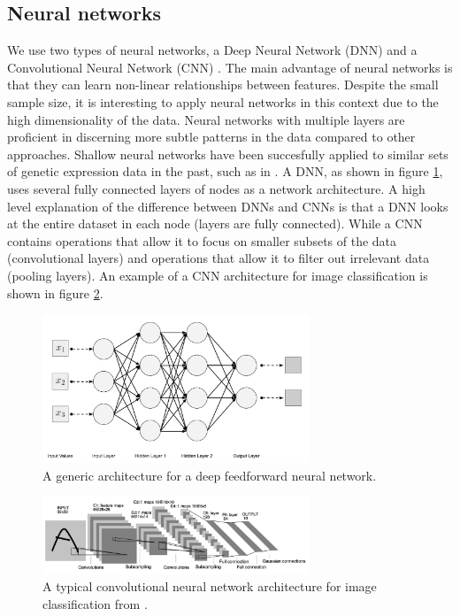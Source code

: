 \documentclass[a4paper,10pt]{article}
\begin{document}
\subsection{Neural networks}
%
We use two types of neural networks, a Deep Neural Network (DNN) \cite{lecun2015deep} and a Convolutional Neural Network (CNN) \cite{Lecun98}. The main advantage of neural networks is that they can learn non-linear relationships between features. Despite the small sample size, it is interesting to apply neural networks in this context due to the high dimensionality of the data. Neural networks with multiple layers are proficient in discerning more subtle patterns in the data compared to other approaches. Shallow neural networks have been succesfully applied to similar sets of genetic expression data in the past, such as in \cite{khan2001classification}.
A DNN, as shown in figure \ref{fig:dnn_architecture}, uses several fully connected layers of nodes as a network architecture. A high level explanation of the difference between DNNs and CNNs is that a DNN looks at the entire dataset in each node (layers are fully connected).
While a CNN contains operations that allow it to focus on smaller subsets of the data (convolutional layers) 
and operations that allow it to filter out irrelevant data (pooling layers). An example of a CNN architecture for image classification is shown in figure \ref{fig:cnn_architecture}.

\begin{figure}[htp]
  \centering{}
  \includegraphics[width=8cm]{images/DNN}
  \caption{A generic architecture for a deep feedforward neural network.}
  \label{fig:dnn_architecture}
\end{figure}

\begin{figure}[htp]
  \centering
  \includegraphics[width=8cm]{images/CNN}
  \caption{A typical convolutional neural network architecture for image classification from \cite{Lecun98}.}
  \label{fig:cnn_architecture}
\end{figure}
\end{document}
